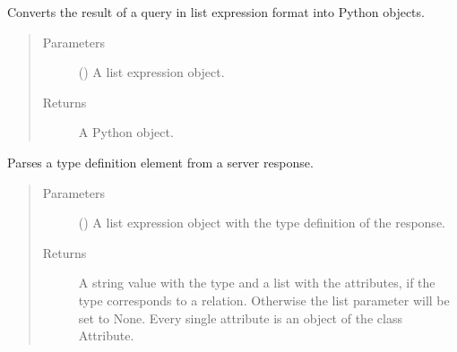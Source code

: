 \documentclass[letterpaper,10pt,english]{sphinxmanual}
\begin{document}

\begin{fulllineitems}
\label{\detokenize{index:secondodb.api.support.secondoparser.parse_query}}
Converts the result of a query in list expression format into Python objects.
\begin{quote}\begin{description}
\item[{Parameters}] \leavevmode
{} () \textendash{} A list expression object.

\item[{Returns}] \leavevmode
A Python object.

\end{description}\end{quote}

\end{fulllineitems}


\begin{fulllineitems}
\label{\detokenize{index:secondodb.api.support.secondoparser.parse_type_definition}}
Parses a type definition element from a  server response.
\begin{quote}\begin{description}
\item[{Parameters}] \leavevmode
{} () \textendash{} A list expression object with the type definition of the response.

\item[{Returns}] \leavevmode
A string value with the type and a list with the attributes, if the type corresponds to a relation.
Otherwise the list parameter will be set to None. Every single attribute is an object of the class
Attribute.

\end{description}\end{quote}

\end{fulllineitems}
\end{document}
